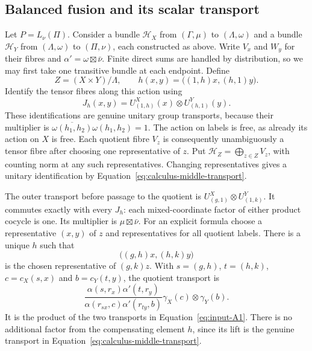 \subsection{Balanced fusion and its scalar transport}

Let $P=L_\nu(\Pi)$.  Consider a bundle $\mathcal H_X$ from
$(\Gamma,\mu)$ to $(\Lambda,\omega)$ and a bundle $\mathcal H_Y$
from $(\Lambda,\omega)$ to $(\Pi,\nu)$, each constructed as above.
Write $V_x$ and $W_y$ for their fibres and
$\alpha'=\omega\boxtimes\bar\nu$.  Finite direct sums are handled
by distribution, so we may first take one transitive bundle at each
endpoint.  Define
\begin{equation}\label{eq:calculus-balanced-labels}
 Z=(X\times Y)/\Lambda,
 \qquad h(x,y)=\bigl((1,h)x,(h,1)y\bigr).
\end{equation}
Identify the tensor fibres along this action using
\begin{equation}\label{eq:calculus-middle-transport}
 J_h(x,y)=U^X_{(1,h)}(x)\otimes U^Y_{(h,1)}(y).
\end{equation}
These identifications are genuine unitary group transports, because
their multiplier is
$\overline{\omega(h_1,h_2)}\omega(h_1,h_2)=1$.
The action on labels is free, as already its action on $X$ is free.
Each quotient fibre $V_z$ is consequently unambiguously a tensor
fibre after choosing one representative of $z$.  Put
$\mathcal H_Z=\bigoplus_{z\in Z}V_z$, with counting norm at any
such representatives.  Changing representatives gives a unitary
identification by Equation~\eqref{eq:calculus-middle-transport}.

The outer transport before passage to the quotient is
$U^X_{(g,1)}\otimes U^Y_{(1,k)}$.  It commutes exactly with every
$J_h$: each mixed-coordinate factor of either product cocycle is
one.  Its multiplier is $\mu\boxtimes\bar\nu$.
For an explicit formula choose a representative $(x,y)$ of $z$ and
representatives for all quotient labels.  There is a unique $h$ such
that
\[
 \bigl((g,h)x,(h,k)y\bigr)
\]
is the chosen representative of $(g,k)z$.  With
$s=(g,h)$, $t=(h,k)$, $c=c_X(s,x)$ and $b=c_Y(t,y)$, the quotient
transport is
\begin{equation}\label{eq:input-A2}
 \frac{\alpha(s,r_x)\alpha'(t,r_y)}
      {\alpha(r_{sx},c)\alpha'(r_{ty},b)}
       \gamma_X(c)\otimes\gamma_Y(b).
\end{equation}
It is the product of the two transports in
Equation~\eqref{eq:input-A1}.  There is no additional factor from
the compensating element $h$, since its lift is the genuine
transport in Equation~\eqref{eq:calculus-middle-transport}.

